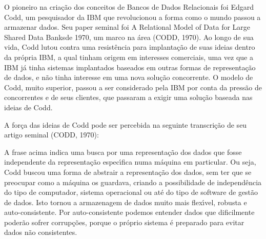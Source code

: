 \documentclass[
12pt,		%
openright,	%
twoside,  %
a4paper,			%
chapter=TITLE,		%
english,			%
french,				%
spanish,			%
brazil				%
]{USPSC-classe/USPSC}
\begin{document}
O pioneiro na cria\c{c}\~ao dos conceitos de Bancos de Dados Relacionais foi Edgard Codd, um pesquisador da IBM que revolucionou a forma como o mundo passou a armazenar dados. Seu paper seminal foi  \textquotedbl A Relational Model of Data for Large Shared Data Banks\textquotedbl  de 1970, um marco na \'area (CODD, 1970). Ao longo de sua vida, Codd lutou contra uma resist\^encia para implanta\c{c}\~ao de suas ideias dentro da pr\'opria IBM, a qual tinham origem em interesses comerciais, uma vez que a IBM j\'a tinha sistemas implantados baseados em outras formas de representa\c{c}\~ao de dados, e n\~ao tinha interesse em uma nova solu\c{c}\~ao concorrente. O modelo de Codd, muito superior, passou a ser considerado pela IBM por conta da press\~ao de concorrentes e de seus clientes, que passaram a exigir uma solu\c{c}\~ao baseada nas ideias de Codd.




A for\c{c}a das ideias de Codd pode ser percebida na seguinte transcri\c{c}\~ao de seu artigo seminal (CODD, 1970):





\noindent\begin{center}\mbox{\centering{}}\end{center}


A frase acima indica uma busca por uma representa\c{c}\~ao dos dados que fosse independente da representa\c{c}\~ao espec\'{\i}fica numa m\'aquina em particular. Ou seja, Codd buscou uma forma de abstrair a representa\c{c}\~ao dos dados, sem ter que se preocupar como a m\'aquina os guardava, criando a possibilidade de independ\^encia do tipo de computador, sistema operacional ou at\'e do tipo de software de gest\~ao de dados. Isto tornou a armazenagem de dados muito mais flex\'{\i}vel, robusta e auto-consistente. Por auto-consistente podemos entender dados que dificilmente poder\~ao sofrer corrup\c{c}\~oes, porque o pr\'oprio sistema \'e preparado para evitar dados n\~ao consistentes.
\end{document}

